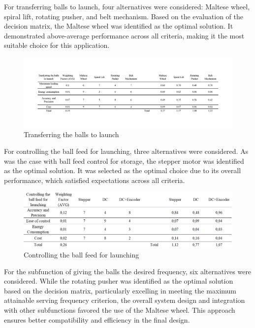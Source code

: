 \documentclass[12pt]{article}
\begin{document}
For transferring balls to launch, four alternatives were considered: Maltese wheel, spiral lift, rotating pusher, and belt mechanism. Based on the evaluation of the decision matrix, the Maltese wheel was identified as the optimal solution. It demonstrated above-average performance across all criteria, making it the most suitable choice for this application.

\begin{figure}[H]
    \centering
    \includegraphics[width=1\textwidth]{Decision matrices/transfer to launch.png}
    \caption{Transferring the balls to launch }
\end{figure}

For controlling the ball feed for launching, three alternatives were considered. As was the case with ball feed control for storage, the stepper motor was identified as the optimal solution. It was selected as the optimal choice due to its overall performance, which satisfied expectations across all criteria.

\begin{figure}[H]
    \centering
    \includegraphics[width=1\textwidth]{Decision matrices/controlling ball feed for launching.png}
    \caption{Controlling the ball feed for launching}
\end{figure}

For the subfunction of giving the balls the desired frequency, six alternatives were considered. While the rotating pusher was identified as the optimal solution based on the decision matrix, particularly excelling in meeting the maximum attainable serving frequency criterion, the overall system design and integration with other subfunctions favored the use of the Maltese wheel. This approach ensures better compatibility and efficiency in the final design.
\end{document}
